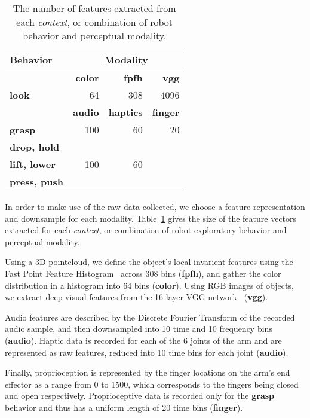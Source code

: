 \begin{table}
\centering
\begin{tabular}[h]{|l|r|r|r|}
	\hline
	\bf Behavior & \multicolumn{3}{c|}{\bf Modality} \\ \hline \hline
	& \bf color & \bf fpfh & \bf vgg \\ \hline
	\bf look & 64 & 308 & 4096 \\ \hline \hline
	& \bf audio & \bf haptics & \bf finger \\ \hline
	\bf grasp & 100 & 60 & 20 \\ \hline
	\bf drop, hold & & & \\
	\bf lift, lower & 100 & 60 & \\
	\bf press, push & & & \\ \hline
\end{tabular}
\caption{The number of features extracted from each \textit{context}, or combination of robot behavior and perceptual modality.}
\label{tab:feature_space_of_contexts}
\end{table}

In order to make use of the raw data collected, we choose a feature representation and downsample for each modality.
Table~\ref{tab:feature_space_of_contexts} gives the size of the feature vectors extracted for each \textit{context}, or combination of robot exploratory behavior and perceptual modality.

Using a 3D pointcloud, we define the object's local invarient features using the Fast Point Feature Histogram~\cite{rusu:icra09}  across 308 bins (\textbf{fpfh}), and gather the color distribution in a histogram into 64 bins (\textbf{color}).
Using RGB images of objects, we extract deep visual features from the 16-layer VGG network~\cite{simonyan:corr14} (\textbf{vgg}).

Audio features are described by the Discrete Fourier Transform of the recorded audio sample, and then downsampled into 10 time and 10 frequency bins (\textbf{audio}). 
Haptic data is recorded for each of the 6 joints of the arm and are represented as raw features, reduced into 10 time bins for each joint (\textbf{audio}).

Finally, proprioception is represented by the finger locations on the arm's end effector as a range from 0 to 1500, which corresponds to the fingers being closed and open respectively. 
Proprioceptive data is recorded only for the \textbf{grasp} behavior and thus has a uniform length of 20 time bins (\textbf{finger}). 